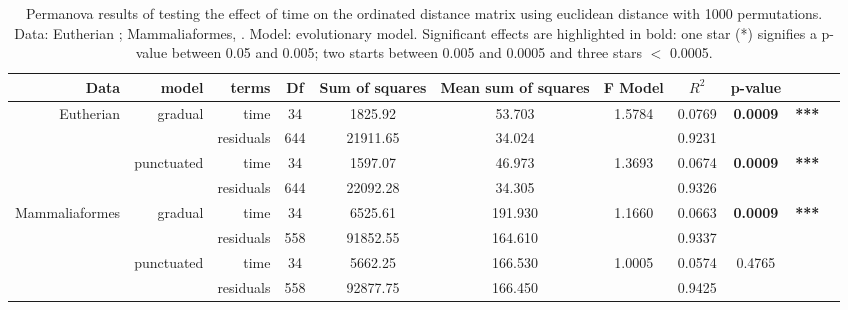 \documentclass[12pt,letterpaper]{article}
\begin{document}
\begin{landscape}
\begin{table}[ht]
\caption{Permanova results of testing the effect of time on the ordinated distance matrix using euclidean distance with 1000 permutations. Data: Eutherian \citep[data from][]{beckancient2014}; Mammaliaformes, \citep[data from][]{Slater2012MEE}. Model: evolutionary model. Significant effects are highlighted in bold: one star (*) signifies a p-value between 0.05 and 0.005; two starts between 0.005 and 0.0005 and three stars $<$ 0.0005.} %
\label{tab:Tab_permanova}
\centering
\begin{tabular}{rrrcccccccc}
  \hline
 Data & model & terms & Df & Sum of squares & Mean sum of squares & F Model & $R^2$ & p-value & \\ 
  \hline
Eutherian     & gradual    & time      & 34  & 1825.92  & 53.703  & 1.5784 & 0.0769 & \textbf{0.0009}& \textbf{***} \\ 
              &            & residuals & 644 & 21911.65 & 34.024  &        & 0.9231 &  &\\ 
              & punctuated & time      & 34  & 1597.07  & 46.973  & 1.3693 & 0.0674 & \textbf{0.0009}& \textbf{***} \\ 
              &            & residuals & 644 & 22092.28 & 34.305  &        & 0.9326 &  &\\ 
Mammaliaformes & gradual    & time      & 34  & 6525.61  & 191.930 & 1.1660 & 0.0663 & \textbf{0.0009}& \textbf{***} \\ 
              &            & residuals & 558 & 91852.55 & 164.610 &        & 0.9337 &  &\\ 
              & punctuated & time      & 34  & 5662.25  & 166.530 & 1.0005 & 0.0574 & 0.4765 &\\ 
              &            & residuals & 558 & 92877.75 & 166.450 &        & 0.9425 &  &\\ 
   \hline
\end{tabular}
\end{table}
\end{landscape}
\end{document}
